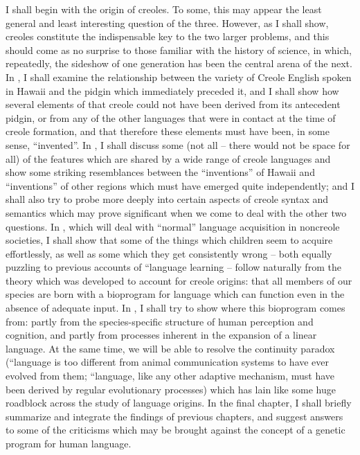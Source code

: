 I shall begin with the origin of creoles. To some, this may appear the least general and least interesting question of the three. However, as I shall show, creoles constitute the indispensable key to the two larger problems, and this should come as no surprise to those familiar with the history of science, in which, repeatedly, the sideshow of one generation has been the central arena of the next. In , I shall examine the relationship between the variety of Creole English spoken in Hawaii and the pidgin which immediately preceded it, and I shall show how several elements of that creole could not have been derived from its antecedent pidgin, or from any of the other languages that were in contact at the time of creole formation, and that therefore these elements must have been, in some sense, ``invented''. In , I shall discuss some (not all -- there would not be space for all) of the features which are shared by a wide range of creole languages and show some striking resemblances between the ``inventions'' of Hawaii and ``inventions'' of other regions which must have emerged quite independently; and I shall also try to probe more deeply into certain aspects of creole syntax and semantics which may prove signifi\-cant when we come to deal with the other two questions. In , which will deal with ``normal'' language acquisition in noncreole societies, I shall show that some of the things which children seem to acquire effortlessly, as well as some which they get consistently wrong -- both equally puzzling to previous accounts of ``language learning{\textquotedbl} -- follow naturally from the theory which was developed to account for creole origins: that all members of our species are born with a bio\-program for language which can function even in the absence of ade\-quate input. In , I shall try to show where this bioprogram comes from: partly from the species-specific structure of human perception and cognition, and partly from processes inherent in the expansion of a linear language. At the same time, we will be able to resolve the continuity paradox (``language is too different from animal communication systems to have ever evolved from them{\textquotedbl}; ``language, like any other adaptive mechanism, must have been derived by regular evolutionary processes{\textquotedbl}) which has lain like some huge roadblock across the study of language origins. In the final chapter, I shall briefly summarize and integrate the findings of previous chapters, and suggest answers to some of the criticisms which may be brought against the concept of a genetic program for human language.